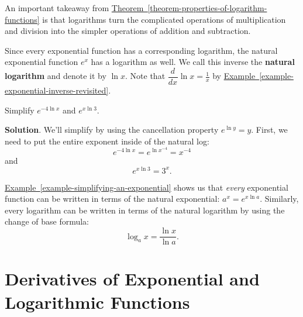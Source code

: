 \documentclass[10pt,]{book}
\newcommand{\terminology}[1]{\textbf{#1}}
\theoremstyle{ptxplainnotitle}
\theoremstyle{ptxplaintitle}
\theoremstyle{ptxplainnotitle}
\theoremstyle{ptxplaintitle}
\theoremstyle{ptxplainnotitle}
\theoremstyle{ptxplaintitle}
\theoremstyle{ptxdefinitionnotitle}
\theoremstyle{ptxdefinitiontitle}
\theoremstyle{ptxdefinitionnotitle}
\theoremstyle{ptxdefinitiontitle}
\theoremstyle{ptxdefinitionnotitle}
\theoremstyle{ptxdefinitiontitle}
\theoremstyle{ptxdefinitionnotitle}
\theoremstyle{ptxdefinitiontitle}
\theoremstyle{ptxdefinitionnotitle}
\theoremstyle{ptxdefinitiontitle}
\numberwithin{equation}{section}
\newcommand{\dv}[3][]{\dfrac{d^{#1} #2}{d #3^{#1}}}
\begin{document}
\hypertarget{p-221}{}%
An important takeaway from \hyperref[theorem-properties-of-logarithm-functions]{Theorem~\ref{theorem-properties-of-logarithm-functions}} is that logarithms turn the complicated operations of multiplication and division into the simpler operations of addition and subtraction.%
\par
\hypertarget{p-222}{}%
Since every exponential function has a corresponding logarithm, the natural exponential function \(e^{x}\) has a logarithm as well. We call this inverse the \terminology{natural logarithm} and denote it by \(\ln x\). Note that \(\dv{}{x}\ln x = \frac{1}{x}\) by \hyperref[example-exponential-inverse-revisited]{Example~\ref{example-exponential-inverse-revisited}}.%
\begin{example}\label{example-simplifying-an-exponential}
\hypertarget{p-223}{}%
Simplify \(e^{-4\ln x}\) and \(e^{x\ln3}\).%
\par\smallskip%
\noindent\textbf{Solution}.\hypertarget{solution-48}{}\quad%
\hypertarget{p-224}{}%
We'll simplify by using the cancellation property \(e^{\ln y} = y\). First, we need to put the entire exponent inside of the natural log:%
\begin{equation*}
e^{-4\ln x} = e^{\ln x^{-4}} = x^{-4}
\end{equation*}
and%
\begin{equation*}
e^{x\ln3} = 3^{x}.
\end{equation*}
%
\end{example}
\hypertarget{p-225}{}%
\hyperref[example-simplifying-an-exponential]{Example~\ref{example-simplifying-an-exponential}} shows us that \emph{every} exponential function can be written in terms of the natural exponential: \(a^{x} = e^{x\ln a}\). Similarly, every logarithm can be written in terms of the natural logarithm by using the change of base formula:%
\begin{equation*}
\log_{a}x = \frac{\ln x}{\ln a}.
\end{equation*}
%
\typeout{************************************************}
\typeout{************************************************}
\section[{Derivatives of Exponential and Logarithmic Functions}]{Derivatives of Exponential and Logarithmic Functions}\label{section-derivatives-of-exponential-and-logarithmic-functions}
\typeout{************************************************}
\typeout{************************************************}
\end{document}
